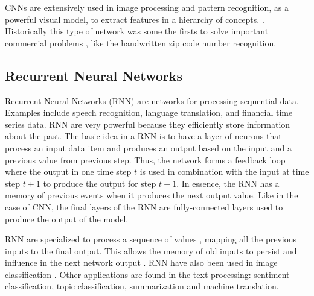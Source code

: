 \documentclass[12pt]{report}
\begin{document}
CNNs are extensively used in image processing and pattern recognition, as a powerful visual model, to extract features in a hierarchy of concepts. \cite{Long2015}. Historically this type of network was some the firsts to solve important commercial problems \cite{Goodfellow2016}, like the handwritten zip code number recognition.

\subsection{Recurrent Neural Networks}
Recurrent Neural Networks (\ac{RNN}) are networks for processing sequential data. Examples include speech recognition, language translation, and financial time series data. \ac{RNN} are very powerful because they  efficiently store information about the past. The basic idea in a RNN is to have 
a layer of neurons that process an input data item and produces an output based on the input and a previous value from previous step. Thus, the network forms a feedback loop where the output in one time step $t$ is used in combination with the input at time step $t+1$ to produce the output for step $t+1$. In essence, the \ac{RNN} has a memory of previous events when  it produces the next output value. Like in the case of \ac{CNN}, the 
final layers of the RNN are fully-connected layers used to produce the output of the model.

\ac{RNN} are specialized to process a sequence of values \cite{Goodfellow2016}, mapping all the previous inputs to the final output. This allows the memory of old inputs to persist and influence in the next network output \cite{Graves2017}. \ac{RNN} have also been used in image classification 
\cite{Chandra2017}. Other applications are found in the text processing: sentiment classification, topic classification, summarization and machine translation.

\end{document}
